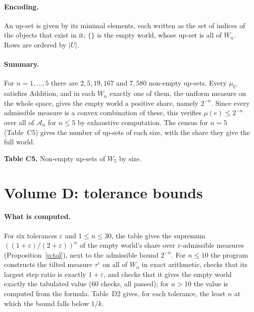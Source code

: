 \documentclass{situationist-preprint}
\begin{document}
\paragraph{Encoding.} An up-set is given by its minimal elements, each written as the set of indices of the objects that exist in it; $\{\}$ is the empty world, whose up-set is all of $W_n$. Rows are ordered by $|U|$.

\paragraph{Summary.} For $n = 1, \ldots, 5$ there are $2, 5, 19, 167$ and $7{,}580$ non-empty up-sets. Every $\mu_U$ satisfies Addition, and in each $W_n$ exactly one of them, the uniform measure on the whole space, gives the empty world a positive share, namely $2^{-n}$. Since every admissible measure is a convex combination of these, this verifies $\mu(e) \leq 2^{-n}$ over all of $\mathcal{A}_n$ for $n \leq 5$ by exhaustive computation. The census for $n = 5$ (Table~C5) gives the number of up-sets of each size, with the share they give the full world.



\begin{center}
\textbf{Table C5.} Non-empty up-sets of $W_5$ by size.\\[0.5em]

\end{center}

\section{Volume D: tolerance bounds}\label{app:d}

\paragraph{What is computed.} For six tolerances $\varepsilon$ and $1 \leq n \leq 30$, the table gives the supremum $((1+\varepsilon)/(2+\varepsilon))^n$ of the empty world's share over $\varepsilon$-admissible measures (Proposition~\ref{p:tol}), next to the admissible bound $2^{-n}$. For $n \leq 10$ the program constructs the tilted measure $\tau^{\varepsilon}$ on all of $W_n$ in exact arithmetic, checks that its largest step ratio is exactly $1+\varepsilon$, and checks that it gives the empty world exactly the tabulated value ($60$ checks, all passed); for $n > 10$ the value is computed from the formula. Table~D2 gives, for each tolerance, the least $n$ at which the bound falls below $1/k$.
\end{document}
